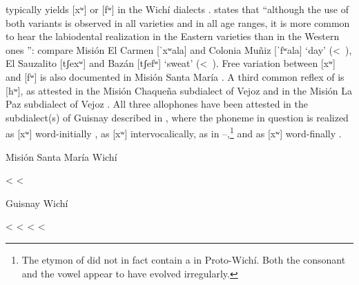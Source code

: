  typically yields [xʷ] or [fʷ] in the Wichí dialects \citep[128]{EN71}. \citet[138]{MC09} states that “although the use of both variants is observed in all varieties  and in all age ranges, it is more common to hear the labiodental realization in the Eastern varieties than in the Western ones ”: compare Misión El Carmen [ˈxʷala] and Colonia Muñiz [ˈfʷala] ‘day’ (<~), El Sauzalito [tʃexʷ] and Bazán [tʃefʷ] ‘sweat’ (<~). Free variation between [xʷ] and [fʷ] is also documented in Misión Santa María . A third common reflex of  is [hʷ], as attested in the Misión Chaqueña subdialect of Vejoz \citep{VU74} and in the Misión La Paz subdialect of Vejoz \citep[44]{MA08}. All three allophones have been attested in the subdialect(s) of Guisnay described in \citet[154]{AFG-SS-09}, where the phoneme in question is realized as [xʷ] \recind [fʷ] word-initially , as [xʷ] \recind [fʷ] \recind [hʷ] intervocalically, as in –,\footnote{The etymon of  did not in fact contain a  in Proto-Wichí. Both the consonant and the vowel appear to have evolved irregularly.} and as [xʷ] word-finally .

\ea
Misión Santa María Wichí \citep{SS07} \label{msm-jfw}\\
    \begin{xlist}
        \ex {} \recind {} < 
        \ex {} \recind {} < 
    \end{xlist}
\z
\ea
Guisnay Wichí \citep[154]{AFG-SS-09}\\
    \begin{xlist}
        \ex {} \recind {} <  \label{wzn-duck}
        \ex {} \recind {} <  \label{wzn-scratch}
        \ex {} \recind {} <  \label{wzn-chair}
        \ex {} <  \label{wzn-eats}
    \end{xlist}
\z
{}

